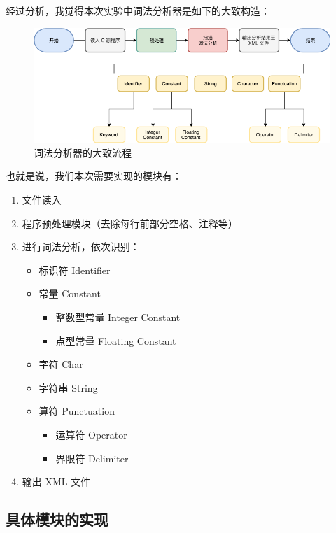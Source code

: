 \documentclass[UTF8]{ctexart}
\begin{document}
经过分析，我觉得本次实验中词法分析器是如下的大致构造：

\begin{figure}[h]
  \includegraphics[width=\linewidth]{images/lexical.png}
  \caption{词法分析器的大致流程}
  \label{fig:figure1}
\end{figure}

也就是说，我们本次需要实现的模块有：

\begin{enumerate}
  \item 文件读入
  \item 程序预处理模块（去除每行前部分空格、注释等）
  \item 进行词法分析，依次识别：
  \begin{itemize}
    \item 标识符 Identifier
    \item 常量 Constant
    \begin{itemize}
        \item 整数型常量 Integer Constant
        \item 点型常量 Floating Constant
    \end{itemize}
    \item 字符 Char
    \item 字符串 String
    \item 算符 Punctuation
      \begin{itemize}
        \item 运算符 Operator
        \item 界限符 Delimiter
      \end{itemize}
  \end{itemize}
  \item 输出 XML 文件
\end{enumerate}

\subsection{具体模块的实现}
\end{document}
